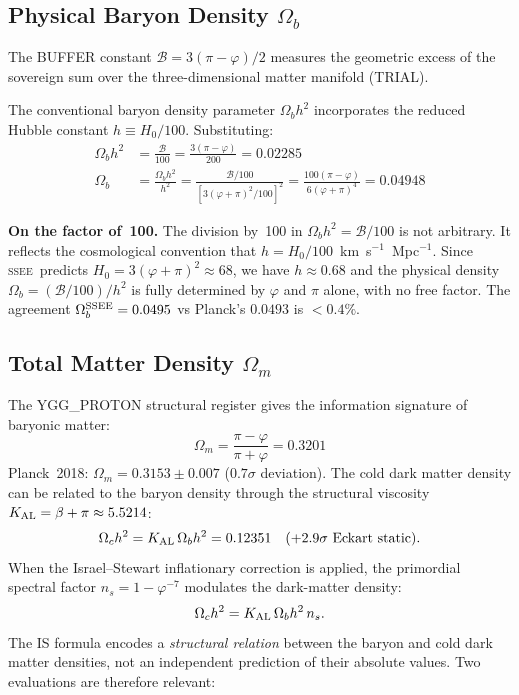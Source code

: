 \documentclass[12pt,a4paper]{article}
\newcommand{\SSEE}{\ifmmode\mathrm{SSEE}\else\textsc{ssee}\fi}
\begin{document}
\subsection{Physical Baryon Density \texorpdfstring{$\Omega_b$}{Omega\_b}}
\label{sec:baryons}

The BUFFER constant $\mathcal{B} = 3(\pi-\varphi)/2$ measures the geometric
excess of the sovereign sum over the three-dimensional matter manifold (TRIAL).

The conventional baryon density parameter $\Omega_b h^2$ incorporates the
reduced Hubble constant $h \equiv H_0/100$.  Substituting:
\begin{align}
\Omega_b h^2 &= \frac{\mathcal{B}}{100} = \frac{3(\pi-\varphi)}{200} = 0.02285 \\[4pt]
\Omega_b     &= \frac{\Omega_b h^2}{h^2}
              = \frac{\mathcal{B}/100}{[3(\varphi+\pi)^2/100]^2}
              = \frac{100(\pi-\varphi)}{6(\varphi+\pi)^4}
              = 0.04948
\label{eq:Ob}
\end{align}

\textbf{On the factor of~100.}
The division by~100 in $\Omega_b h^2 = \mathcal{B}/100$ is not arbitrary.
It reflects the cosmological convention that $h = H_0/100$~km~s$^{-1}$~Mpc$^{-1}$.
Since \SSEE\ predicts $H_0 = 3(\varphi+\pi)^2 \approx 68$, we have $h \approx 0.68$
and the physical density $\Omega_b = (\mathcal{B}/100)/h^2$ is fully determined by
$\varphi$ and $\pi$ alone, with no free factor.
The agreement $\Omega_b^{\rm SSEE} = 0.0495$ vs Planck's $0.0493$ is $<0.4\%$.

\subsection{Total Matter Density \texorpdfstring{$\Omega_m$}{Omega\_m}}
\label{sec:matter}

The YGG\_PROTON structural register gives the information signature of baryonic matter:
\begin{equation}
\Omega_m = \frac{\pi-\varphi}{\pi+\varphi} = 0.3201
\end{equation}
Planck~2018: $\Omega_m = 0.3153\pm0.007$ ($0.7\sigma$ deviation).
The cold dark matter density can be related to the baryon density through the
structural viscosity $K_{\rm AL} = \beta + \pi \approx 5.5214$:
\begin{equation}
\Omega_c h^2 = K_{\rm AL}\,\Omega_b h^2 = 0.12351 \quad (+2.9\sigma\text{ Eckart static}).
\label{eq:omch2_static}
\end{equation}
When the Israel--Stewart inflationary correction is applied, the primordial spectral
factor $n_s = 1-\varphi^{-7}$ modulates the dark-matter density:
\begin{equation}
\Omega_c h^2 = K_{\rm AL}\,\Omega_b h^2\,n_s.
\label{eq:omch2_IS}
\end{equation}
The IS formula encodes a \emph{structural relation} between the baryon and cold
dark matter densities, not an independent prediction of their absolute values.
Two evaluations are therefore relevant:
\end{document}
